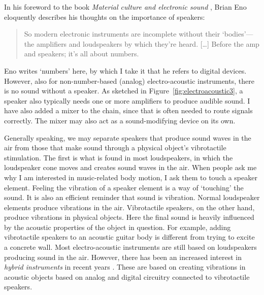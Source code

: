 In his foreword to the book \emph{Material culture and electronic sound} \citep{weium_material_2013}, Brian Eno eloquently describes his thoughts on the importance of speakers:

\begin{quote}
So modern electronic instruments are incomplete without their `bodies'---the amplifiers and loudspeakers by which they're heard. [\ldots] Before the amp and speakers; it's all about numbers.
\end{quote}

Eno writes `numbers' here, by which I take it that he refers to digital devices. However, also for non-number-based (analog) electro-acoustic instruments, there is no sound without a speaker. As sketched in Figure~\ref{fig:electroacoustic3}, a speaker also typically needs one or more amplifiers to produce audible sound. I have also added a mixer to the chain, since that is often needed to route signals correctly. The mixer may also act as a sound-modifying device on its own.

Generally speaking, we may separate speakers that produce sound waves in the air from those that make sound through a physical object's vibrotactile stimulation. The first is what is found in most loudspeakers, in which the loudspeaker cone moves and creates sound waves in the air. When people ask me why I am interested in music-related body motion, I ask them to touch a speaker element. Feeling the vibration of a speaker element is a way of `touching' the sound. It is also an efficient reminder that sound is vibration. Normal loudspeaker elements produce vibrations in the air. Vibrotactile speakers, on the other hand, produce vibrations in physical objects. Here the final sound is heavily influenced by the acoustic properties of the object in question. For example, adding vibrotactile speakers to an acoustic guitar body is different from trying to excite a concrete wall. Most electro-acoustic instruments are still based on loudspeakers producing sound in the air. However, there has been an increased interest in \emph{hybrid instruments} in recent years \citep{lahdeoja_augmented_2015,eldridge_self-resonating_2017,NIME20_42}. These are based on creating vibrations in acoustic objects based on analog and digital circuitry connected to vibrotactile speakers.

